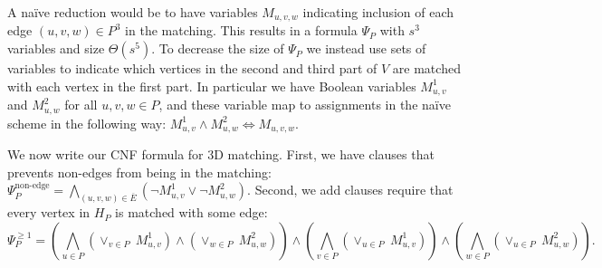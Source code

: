 \documentclass[11pt]{article}
\begin{document}
A na\"{i}ve reduction would be to have variables $M_{u,v,w}$ indicating inclusion of each
edge $(u,v,w) \in P^3$ in the matching. This results in a formula $\Psi_P$ with
$s^3$ variables and size $\Theta(s^5)$.
To decrease the size of $\Psi_P$ we instead use sets
of variables to indicate which vertices in the second and third part of $V$
are matched with each vertex in the first part.  In particular we have
Boolean variables $M_{u,v}^1$ and $M_{u,w}^2$ for all $u, v, w \in P$,
and these variable map to assignments in the na\"{i}ve scheme in the
following way: $M_{u,v}^1 \wedge M_{u,w}^2 \Leftrightarrow M_{u,v,w}$.

We now write our CNF formula for 3D matching.  First, we have clauses that prevents non-edges from
being in the matching:
  $\Psi_P^{\text{non-edge}} = \bigwedge_{(u,v,w) \in \overline{E}}
  (\neg M_{u,v}^1 \vee \neg M_{u,w}^2).$
Second, we add clauses require that every vertex in $H_P$ is matched with some
edge:
\begin{equation}
  \Psi_P^{\ge 1} =
  \left(\bigwedge_{u \in P} (\vee_{v\in P} ~M_{u,v}^1) \wedge (\vee_{w \in P} ~M_{u,w}^2)\right)
  \wedge \left(\bigwedge_{v \in P} (\vee_{u \in P} ~M_{u,v}^1)\right)
  \wedge \left(\bigwedge_{w \in P} (\vee_{u \in P} ~M_{u,w}^2)\right).
\end{equation}
\end{document}
